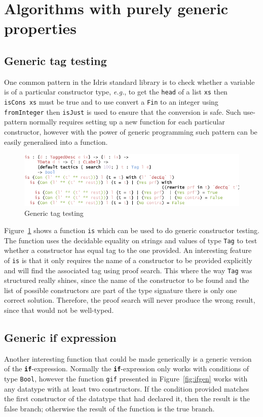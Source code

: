 \documentclass{ituthesis}
\newcommand{\tttype}[1]{\textcolor{type-color}{\texttt{#1}}}
\newcommand{\ttdec}[1]{\textcolor{declared-var-color}{\texttt{#1}}}
\newcommand{\ttvar}[1]{\textcolor{local-var-color}{\texttt{#1}}}
\theoremstyle{break}
\begin{document}
\section{Algorithms with purely generic properties}
\label{sec:Algorithms with purely generic properties}
\subsection{Generic tag testing}
\label{sub:Generic tag testing}
One common pattern in the Idris standard library is to check whether a variable is of a particular constructor type, \textit{e.g.},
to get the \ttdec{head} of a list \ttvar{xs} then \ttdec{isCons}~\ttvar{xs} must be true and to use convert a \tttype{Fin} to an integer using \ttdec{fromInteger} then \ttdec{isJust} is used to ensure that the conversion is safe.
Such use-pattern normally requires setting up a new function for each particular constructor, however with the power of generic programming such pattern can be easily generalised into a function.

\begin{figure}[ht]
\begin{center}
    \includegraphics[scale=0.5]{Figures/GenericIs.png}
\end{center}
\caption{Generic tag testing}
\label{fig:isgen}
\end{figure}

Figure~\ref{fig:isgen} shows a function \ttdec{is} which can be used to do generic constructor testing.
The function uses the decidable equality on strings and values of type \tttype{Tag} to test whether a constructor has equal tag to the one provided.
An interesting feature of \ttdec{is} is that it only requires the name of a constructor to be provided explicitly and will find the associated tag using proof search.
This where the way \tttype{Tag} was structured really shines, since the name of the constructor to be found and the list of possible constructors are part of the type signature
there is only one correct solution.
Therefore, the proof search will never produce the wrong result, since that would not be well-typed.

\subsection{Generic if expression}
\label{sub:Generic if expression}
Another interesting function that could be made generically is a generic version of the \texttt{\textbf{if}}-expression.
Normally the \texttt{\textbf{if}}-expression only works with conditions of type \tttype{Bool}, however the function \ttdec{gif} presented in Figure~\ref{fig:ifgen} works with any datatype with at least two constructors.
If the condition provided matches the first constructor of the datatype that had declared it, then the result is the false branch; otherwise the result of the function is the true branch.
\end{document}
